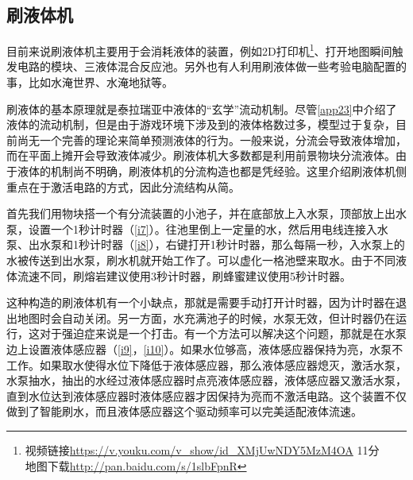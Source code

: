\subsection{刷液体机}

目前来说刷液体机主要用于会消耗液体的装置，例如2D打印机\footnote{视频链接\url{https://v.youku.com/v_show/id_XMjUwNDY5MzM4OA} 11分\\地图下载\url{http://pan.baidu.com/s/1slbFpnR}}、打开地图瞬间触发电路的模块、三液体混合反应池。另外也有人利用刷液体做一些考验电脑配置的事，比如水淹世界、水淹地狱等。

刷液体的基本原理就是泰拉瑞亚中液体的“玄学”流动机制。尽管\autoref{app23}中介绍了液体的流动机制，但是由于游戏环境下涉及到的液体格数过多，模型过于复杂，目前尚无一个完善的理论来简单预测液体的行为。一般来说，分流会导致液体增加，而在平面上摊开会导致液体减少。刷液体机大多数都是利用前景物块分流液体。由于液体的机制尚不明确，刷液体机的分流构造也都是凭经验。这里介绍刷液体机侧重点在于激活电路的方式，因此分流结构从简。

首先我们用物块搭一个有分流装置的小池子，并在底部放上入水泵，顶部放上出水泵，设置一个1秒计时器（\autoref{i7}）。往池里倒上一定量的水，然后用电线连接入水泵、出水泵和1秒计时器（\autoref{i8}），右键打开1秒计时器，那么每隔一秒，入水泵上的水被传送到出水泵，刷水机就开始工作了。可以虚化一格池壁来取水。由于不同液体流速不同，刷熔岩建议使用3秒计时器，刷蜂蜜建议使用5秒计时器。

这种构造的刷液体机有一个小缺点，那就是需要手动打开计时器，因为计时器在退出地图时会自动关闭。另一方面，水充满池子的时候，水泵无效，但计时器仍在运行，这对于强迫症来说是一个打击。有一个方法可以解决这个问题，那就是在水泵边上设置液体感应器（\autoref{i9}，\autoref{i10}）。如果水位够高，液体感应器保持为亮，水泵不工作。如果取水使得水位下降低于液体感应器，那么液体感应器熄灭，激活水泵，水泵抽水，抽出的水经过液体感应器时点亮液体感应器，液体感应器又激活水泵，直到水位达到液体感应器时液体感应器才因保持为亮而不激活电路。这个装置不仅做到了智能刷水，而且液体感应器这个驱动频率可以完美适配液体流速。

